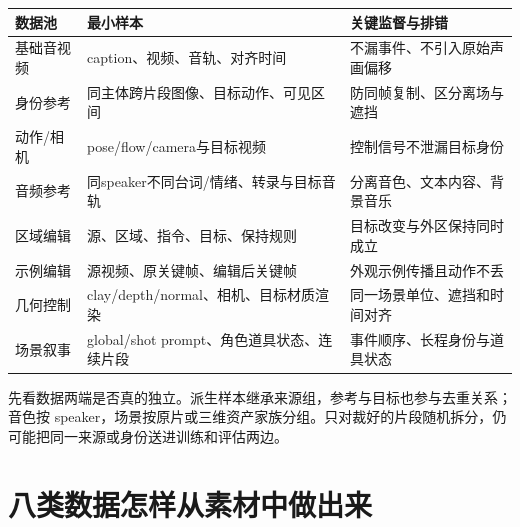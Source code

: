 {\def\LTcaptype{table} %
\small\setlength{\tabcolsep}{3pt}\renewcommand{\arraystretch}{1.18}
\begin{longtable}[]{@{}
  >{\raggedright\arraybackslash}p{}
  >{\raggedright\arraybackslash}p{}
  >{\raggedright\arraybackslash}p{}@{}}
\toprule\noalign{}
\begin{minipage}[b]{\linewidth}\raggedright
数据池
\end{minipage} & \begin{minipage}[b]{\linewidth}\raggedright
最小样本
\end{minipage} & \begin{minipage}[b]{\linewidth}\raggedright
关键监督与排错
\end{minipage} \\
\midrule\noalign{}
\endhead
\bottomrule\noalign{}
\endlastfoot
基础音视频 & caption、视频、音轨、对齐时间 & 不漏事件、不引入原始声画偏移 \\
身份参考 & 同主体跨片段图像、目标动作、可见区间 & 防同帧复制、区分离场与遮挡 \\
动作/相机 & pose/flow/camera与目标视频 & 控制信号不泄漏目标身份 \\
音频参考 & 同speaker不同台词/情绪、转录与目标音轨 & 分离音色、文本内容、背景音乐 \\
区域编辑 & 源、区域、指令、目标、保持规则 & 目标改变与外区保持同时成立 \\
示例编辑 & 源视频、原关键帧、编辑后关键帧 & 外观示例传播且动作不丢 \\
几何控制 & clay/depth/normal、相机、目标材质渲染 & 同一场景单位、遮挡和时间对齐 \\
场景叙事 & global/shot prompt、角色道具状态、连续片段 & 事件顺序、长程身份与道具状态 \\
\end{longtable}
}

先看数据两端是否真的独立。派生样本继承来源组，参考与目标也参与去重关系；音色按 speaker，场景按原片或三维资产家族分组。只对裁好的片段随机拆分，仍可能把同一来源或身份送进训练和评估两边。

\section{八类数据怎样从素材中做出来}\label{seedance-m20-ux516bux7c7bux6570ux636eux600eux6837ux4eceux7d20ux6750ux4e2dux505aux51faux6765}

